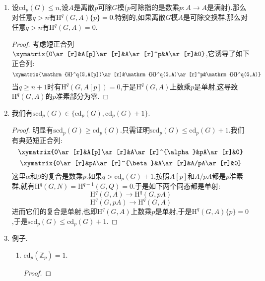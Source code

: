 \begin{enumerate}
\begin{proof}
		设$A$是$p$扭离散单$G$模.任取非零元$a\in A$,它生成的$G$子模记作$M$,那么$a$的稳定子是一个开子群$H$,于是存在满同态$\mathbb{F}_p[G/H]\to M$.特别的此时$M$是有限集.进而按照$A$是单模就有$A=M$.于是$A$是$G/H$模.换句话讲归结为设$G$是有限$p$群.那么此时$A^G$非平凡,进而依旧因为它是单模得到$A=A^G$,也即$A$是平凡$G$模.按照$A$被$p$零化并且是单模,迫使它是$\mathbb{Z}/p\mathbb{Z}$.
	\end{proof}
	\item 设$\mathrm{cd}_p(G)\le n$,设$A$是离散$p$可除$G$模($p$可除指的是数乘$p:A\to A$是满射).那么对任意$q>n$有$\mathrm{H}^q(G,A)\{p\}=0$.特别的,如果离散$G$模$A$是可除交换群,那么对任意$q>n$有$\mathrm{H}^q(G,A)=0$.
	\begin{proof}
		
		考虑短正合列$\xymatrix{0\ar[r]&A[p]\ar[r]&A\ar[r]^p&A\ar[r]&0}$,它诱导了如下正合列:
		$$\xymatrix{\mathrm{H}^q(G,A[p])\ar[r]&\mathrm{H}^q(G,A)\ar[r]^p&\mathrm{H}^q(G,A)}$$
		当$q\ge n+1$时有$\mathrm{H}^q(G,A[p])=0$,于是$\mathrm{H}^q(G,A)$上数乘$p$是单射,这导致$\mathrm{H}^q(G,A)$的$p$准素部分为零.
	\end{proof}
	\item 我们有$\mathrm{scd}_p(G)\in\{\mathrm{cd}_p(G),\mathrm{cd}_p(G)+1\}$.
	\begin{proof}
		
		明显有$\mathrm{scd}_p(G)\ge\mathrm{cd}_p(G)$.只需证明$\mathrm{scd}_p(G)\le\mathrm{cd}_p(G)+1$.我们有典范短正合列:
		$$\xymatrix{0\ar[r]&A[p]\ar[r]&A\ar[r]^{\alpha}&pA\ar[r]&0}$$
		$$\xymatrix{0\ar[r]&pA\ar[r]^{\beta}&A\ar[r]&A/pA\ar[r]&0}$$
		这里$\alpha$和$\beta$的复合是数乘$p$.如果$q>\mathrm{cd}_p(G)+1$,按照$A[p]$和$A/pA$都是$p$准素群,就有$\mathrm{H}^q(G,N)=\mathrm{H}^{q-1}(G,Q)=0$.于是如下两个同态都是单射:
		$$\mathrm{H}^q(G,A)\to\mathrm{H}^q(G,pA)$$
		$$\mathrm{H}^q(G,pA)\to\mathrm{H}^q(G,A)$$
		进而它们的复合是单射,也即$\mathrm{H}^q(G,A)$上数乘$p$是单射,于是$\mathrm{H}^q(G,A)\{p\}=0$,于是$\mathrm{scd}_p(G)\le\mathrm{cd}_p(G)+1$.
	\end{proof}
	\item 例子.
	\begin{enumerate}
		\item $\mathrm{cd}_p(\mathbb{Z}_p)=1$.
		\begin{proof}
			

\end{proof}
\end{enumerate}
\end{enumerate}

